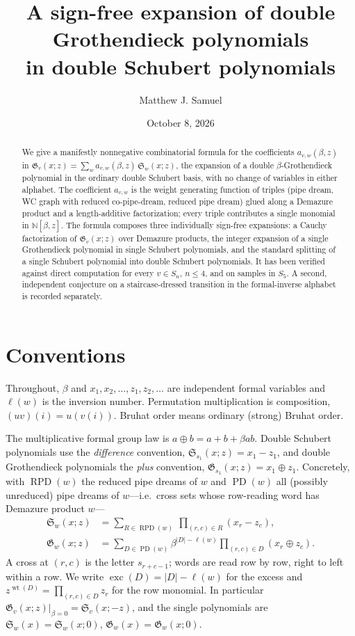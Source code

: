 \documentclass[11pt]{article}
\title{A sign-free expansion of double Grothendieck polynomials\\
in double Schubert polynomials}
\author{Matthew J. Samuel}
\date{October 8, 2026}
\theoremstyle{definition}
\theoremstyle{remark}
\newcommand{\Sch}{\mathfrak{S}}
\newcommand{\Groth}{\mathfrak{G}}
\newcommand{\PD}{\operatorname{PD}}
\newcommand{\RPD}{\operatorname{RPD}}
\newcommand{\NN}{\mathbb{N}}
\newcommand{\wt}{\operatorname{wt}}
\newcommand{\exc}{\operatorname{exc}}
\begin{document}
\maketitle

\begin{abstract}
We give a manifestly nonnegative combinatorial formula for the coefficients
$a_{v,w}(\beta,z)$ in
$\Groth_v(x;z)=\sum_w a_{v,w}(\beta,z)\,\Sch_w(x;z)$,
the expansion of a double $\beta$-Grothendieck polynomial in the ordinary
double Schubert basis, with no change of variables in either alphabet.
The coefficient $a_{v,w}$ is the weight generating function of triples
(pipe dream, WC graph with reduced co-pipe-dream, reduced pipe dream)
glued along a Demazure product and a length-additive factorization; every
triple contributes a single monomial in $\NN[\beta,z]$.  The formula
composes three individually sign-free expansions: a Cauchy factorization
of $\Groth_v(x;z)$ over Demazure products, the integer expansion of a single
Grothendieck polynomial in single Schubert polynomials, and the standard
splitting of a single Schubert polynomial into double Schubert polynomials.
It has been verified against direct computation for every $v\in S_n$,
$n\le 4$, and on samples in $S_5$.  A second, independent conjecture on a
staircase-dressed transition in the formal-inverse alphabet is recorded
separately.
\end{abstract}

\section{Conventions}

Throughout, $\beta$ and $x_1,x_2,\dots,z_1,z_2,\dots$ are independent formal
variables and $\ell(w)$ is the inversion number.  Permutation multiplication
is composition, $(uv)(i)=u(v(i))$.  Bruhat order means ordinary (strong)
Bruhat order.

The multiplicative formal group law is $a\oplus b=a+b+\beta ab$.
Double Schubert polynomials use the \emph{difference} convention,
$\Sch_{s_1}(x;z)=x_1-z_1$, and double Grothendieck polynomials the
\emph{plus} convention, $\Groth_{s_1}(x;z)=x_1\oplus z_1$.  Concretely,
with $\RPD(w)$ the reduced pipe dreams of $w$ and $\PD(w)$ all
(possibly unreduced) pipe dreams of $w$---i.e.\ cross sets whose
row-reading word has Demazure product $w$---
\begin{align}
 \Sch_w(x;z)&=\sum_{R\in\RPD(w)}\ \prod_{(r,c)\in R}(x_r-z_c),
 \label{eq:schub-pd}\\
 \Groth_w(x;z)&=\sum_{D\in\PD(w)}\beta^{|D|-\ell(w)}
   \prod_{(r,c)\in D}(x_r\oplus z_c).
 \label{eq:groth-pd}
\end{align}
A cross at $(r,c)$ is the letter $s_{r+c-1}$; words are read row by row,
right to left within a row.  We write $\exc(D)=|D|-\ell(w)$ for the excess
and $z^{\wt(D)}=\prod_{(r,c)\in D}z_r$ for the row monomial.  In particular
$\Groth_v(x;z)|_{\beta=0}=\Sch_v(x;-z)$, and the single polynomials are
$\Sch_w(x)=\Sch_w(x;0)$, $\Groth_w(x)=\Groth_w(x;0)$.
\end{document}
